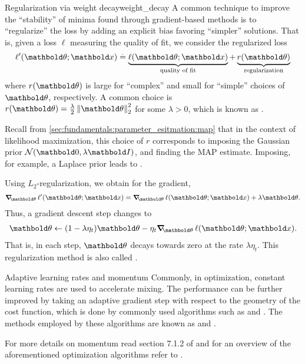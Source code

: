 \begin{rmk}{Regularization via weight decay}{weight_decay}
  A common technique to improve the ``stability'' of minima found through gradient-based methods is to ``regularize'' the loss by adding an explicit bias favoring ``simpler'' solutions.
  That is, given a loss $\ell$ measuring the quality of fit, we consider the regularized loss \begin{align}
    \ell'(\vtheta; \vx) \defeq \underbrace{\ell(\vtheta; \vx)}_{\text{quality of fit}} + \underbrace{r(\vtheta)}_{\text{regularization}}
  \end{align} where $r(\vtheta)$ is large for ``complex'' and small for ``simple'' choices of $\vtheta$, respectively.
  A common choice is $r(\vtheta) = \frac{\lambda}{2} \norm{\vtheta}_2^2$ for some $\lambda > 0$, which is known as .

  Recall from \cref{sec:fundamentals:parameter_esitmation:map} that in the context of likelihood maximization, this choice of $r$ corresponds to imposing the Gaussian prior $\N{\vzero}{\lambda\mI}$, and finding the MAP estimate.
  Imposing, for example, a Laplace prior leads to .

  Using $L_2$-regularization, we obtain for the gradient, \begin{align}
    \grad_\vtheta \ell'(\vtheta; \vx) = \grad_\vtheta \ell(\vtheta; \vx) + \lambda \vtheta.
  \end{align}
  Thus, a gradient descent step changes to \begin{align}
    \vtheta \gets (1 - \lambda \eta_t) \vtheta - \eta_t \grad_\vtheta \ell(\vtheta; \vx).
  \end{align}
  That is, in each step, $\vtheta$ decays towards zero at the rate $\lambda \eta_t$.
  This regularization method is also called .
\end{rmk}

\begin{rmk}{Adaptive learning rates and momentum}{}
  Commonly, in optimization, constant learning rates are used to accelerate mixing.
  The performance can be further improved by taking an adaptive gradient step with respect to the geometry of the cost function, which is done by commonly used algorithms such as  and .
  The methods employed by these algorithms are known as  and .

  For more details on momentum read section 7.1.2 of  and for an overview of the aforementioned optimization algorithms refer to .
\end{rmk}

